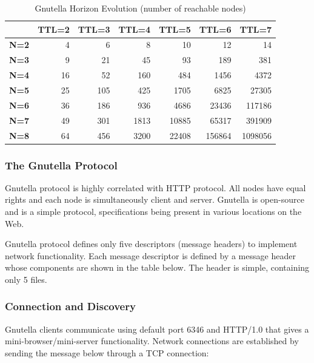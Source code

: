 \begin{table}[htb]
  \centering
  \caption{Gnutella Horizon Evolution (number of reachable nodes)}
  \label{tab:p2p-systems:gnutella-horizon}
  \begin{tabular}{@{}lrrrrrr@{}}
    \toprule
      & \textbf{TTL=2} & \textbf{TTL=3} & \textbf{TTL=4} & \textbf{TTL=5} &
      \textbf{TTL=6} & \textbf{TTL=7} \\
    \midrule
      \textbf{N=2} & 4 & 6 & 8 & 10 & 12 & 14 \\
      \textbf{N=3} & 9 & 21 & 45 & 93 & 189 & 381 \\
      \textbf{N=4} & 16 & 52 & 160 & 484 & 1456 & 4372 \\
      \textbf{N=5} & 25 & 105 & 425 & 1705 & 6825 & 27305 \\
      \textbf{N=6} & 36 & 186 & 936 & 4686 & 23436 & 117186 \\
      \textbf{N=7} & 49 & 301 & 1813 & 10885 & 65317 & 391909 \\
      \textbf{N=8} & 64 & 456 & 3200 & 22408 & 156864 & 1098056 \\
    \bottomrule
  \end{tabular}
\end{table}

\subsubsection{The Gnutella Protocol}

Gnutella protocol is highly correlated with HTTP protocol. All nodes have equal
rights and each node is simultaneously client and server. Gnutella is
open-source and is a simple protocol, specifications being present in various
locations on the Web.

Gnutella protocol defines only five descriptors (message headers) to implement
network functionality. Each message descriptor is defined by a message header
whose components are shown in the table below. The header is simple, containing
only 5 files.

\subsubsection{Connection and Discovery}

Gnutella clients communicate using default port 6346 and HTTP/1.0 that gives a
mini-browser/mini-server functionality. Network connections are established by
sending the message below through a TCP connection:

